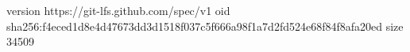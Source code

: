 version https://git-lfs.github.com/spec/v1
oid sha256:f4eced1d8e4d47673dd3d1518f037c5f666a98f1a7d2fd524e68f84f8afa20ed
size 34509
